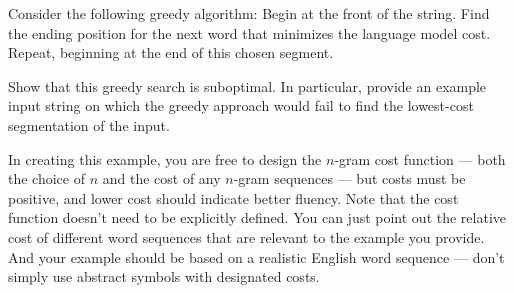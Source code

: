 \item {}

Consider the following greedy algorithm: Begin at the front of the string. Find
the ending position for the next word that minimizes the language model cost.
Repeat, beginning at the end of this chosen segment.

Show that this greedy search is suboptimal.  In particular, provide an example
input string on which the greedy approach would fail to find the lowest-cost
segmentation of the input.

In creating this example, you are free to design the $n$-gram cost function ---
both the choice of $n$ and the cost of any $n$-gram sequences --- but costs must
be positive, and lower cost should indicate better fluency. Note that the cost
function doesn't need to be explicitly defined. You can just point out the
relative cost of different word sequences that are relevant to the example you
provide. And your example should be based on a realistic English word sequence 
--- don't simply use abstract symbols with designated costs.
